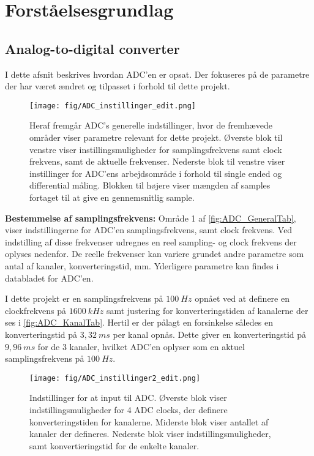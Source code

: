 \chapter{Forståelsesgrundlag}
\section{Analog-to-digital converter}
I dette afsnit beskrives hvordan ADC'en er opsat. Der fokuseres på de parametre der har været ændret og tilpasset i forhold til dette projekt.

\begin{figure}[H]
	\centering
	\texttt{[image: fig/ADC\_instillinger\_edit.png]}
	\caption{Heraf fremgår ADC's generelle indstillinger, hvor de fremhævede områder viser parametre relevant for dette projekt. Øverste blok til venstre viser instillingsmuligheder for samplingsfrekvens samt clock frekvens, samt de aktuelle frekvenser. Nederste blok til venstre viser instillinger for ADC'ens arbejdsområde i forhold til single ended og differential måling. Blokken til højere viser mængden af samples fortaget til at give en gennemsnitlig sample.}
	\label{fig:ADC_GeneralTab}
\end{figure}

\textbf{Bestemmelse af samplingsfrekvens:}
Område 1 af \autoref{fig:ADC_GeneralTab}, viser indstillingerne for ADC'en samplingsfrekvens, samt clock frekvens. Ved indstilling af disse frekvenser udregnes en reel sampling- og clock frekvens der oplyses nedenfor. De reelle frekvenser kan variere grundet andre parametre som antal af kanaler, konverteringstid, mm. Yderligere parametre kan findes i databladet for ADC'en. 

\noindent
I dette projekt er en samplingsfrekvens på $100~Hz$ opnået ved at definere en clockfrekvens på $1600~kHz$ samt justering for konverteringstiden af kanalerne der ses i \autoref{fig:ADC_KanalTab}. Hertil er der pålagt en forsinkelse således en konverteringstid på $3,32~ms$ per kanal opnås. Dette giver en konverteringstid på $9,96~ms$ for de 3 kanaler, hvilket ADC'en oplyser som en aktuel samplingsfrekvens på $100~Hz$. 

\begin{figure}[H]
	\centering 
	\texttt{[image: fig/ADC\_instillinger2\_edit.png]}
	\caption{Indstillinger for at input til ADC. Øverste blok viser indstillingsmuligheder for 4 ADC clocks, der definere konverteringstiden for kanalerne. Miderste blok viser antallet af kanaler der defineres. Nederste blok viser indstillingsmuligheder, samt konvertieringstid for de enkelte kanaler.}
	\label{fig:ADC_KanalTab}
\end{figure}

